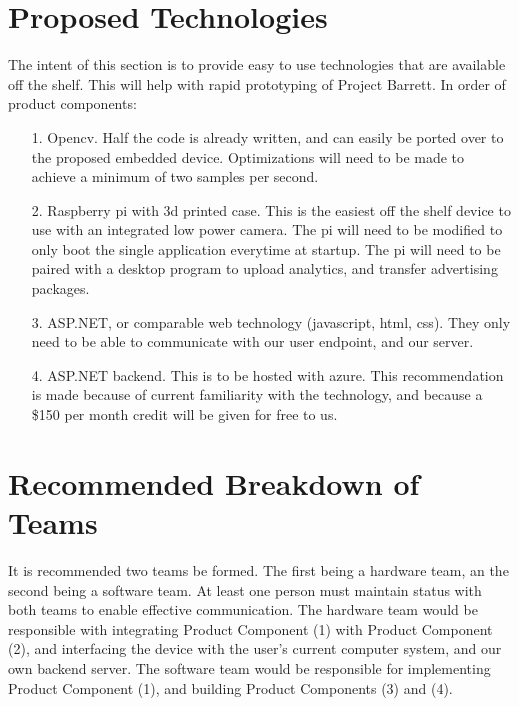 \documentclass[12pt]{article}
\begin{document}
\section{Proposed Technologies}
The intent of this section is to provide easy to use technologies that are available off the shelf. This will help with rapid prototyping of Project Barrett. In order of product components:
\begin{enumerate}
\item[1.]
Opencv. Half the code is already written, and can easily be ported over to the proposed embedded device. Optimizations will need to be made to achieve a minimum of two samples per second.
\item[2.]
Raspberry pi with 3d printed case. This is the easiest off the shelf device to use with an integrated low power camera. The pi will need to be modified to only boot the single application everytime at startup. The pi will need to be paired with a desktop program to upload analytics, and transfer advertising packages.
\item[3.]
ASP.NET, or comparable web technology (javascript, html, css). They only need to be able to communicate with our user endpoint, and our server.
\item[4.]
ASP.NET backend. This is to be hosted with azure. This recommendation is made because of current familiarity with the technology, and because a \$150 per month credit will be given for free to us.
\end{enumerate}
\section{Recommended Breakdown of Teams}
It is recommended two teams be formed. The first being a hardware team, an the second being a software team. At least one person must maintain status with both teams to enable effective communication.
\newline
The hardware team would be responsible with integrating Product Component (1) with Product Component (2), and interfacing the device with the user's current computer system, and our own backend server.
\newline
The software team would be responsible for implementing Product Component (1), and building Product Components (3) and (4).
\end{document}
